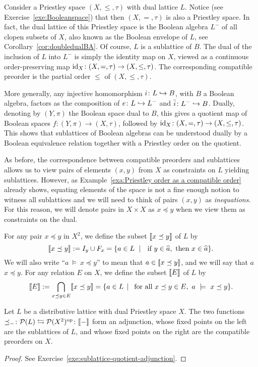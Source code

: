 \begin{example}\label{exa:Priestley order as a compatible order}
Consider a Priestley space $(X,\leq, \tau)$ with dual lattice $L$. Notice (see Exercise~\ref{exe:Booleanspace}) that then $(X,=,\tau)$ is also a Priestley space. In fact, the dual lattice of this Priestley space is the Boolean algebra $L^-$ of all clopen subsets of $X$, also known as the Boolean envelope of $L$, see Corollary~\ref{cor:doubledualBA}. Of course, $L$ is a sublattice of $B$. The dual of the inclusion of $L$ into $L^-$ is simply the identity map on $X$, viewed as a continuous order-preserving map $\mathrm{id}_X\colon (X,=,\tau)\to(X,\leq, \tau)$. The corresponding compatible preorder is the partial order $\leq$ of $(X,\leq, \tau)$.

More generally, any injective homomorphism $i \colon L \hookrightarrow B$, with $B$ a Boolean algebra, factors as the composition of $e \colon L \hookrightarrow L^-$ and $\bar{i} \colon L^- \hookrightarrow B$. Dually, denoting by $(Y,\pi)$ the Boolean space dual to $B$, this gives a quotient map of Boolean spaces $f \colon (Y,\pi) \to (X,\tau)$, followed by $\mathrm{id}_X \colon (X, =, \tau) \to (X, \leq,\tau)$. This shows that sublattices of Boolean algebras can be understood dually by a Boolean equivalence relation together with a Priestley order on the quotient.
\end{example}

As before, the correspondence between compatible preorders and sublattices allows us to view pairs of elements $(x,y)$ from $X$ as constraints on $L$ yielding sublattices. However, as Example~\ref{exa:Priestley order as a compatible order} already shows, equating elements of the space is not a fine enough notion to witness all sublattices and we will need to think of pairs $(x,y)$ as \emph{inequations}. For this reason, we will denote pairs in $X\times X$ as $x\preceq y$ when we view them as constraints on the dual.

\begin{definition}\label{def:ineq}
For any pair $x\preceq y$ in $X^2$, we define the subset $\llbracket {x\preceq y} \rrbracket$ of $L$ by
\[ \llbracket {x\preceq y} \rrbracket := I_y \cup F_x = \{a \in L \ \mid \ \text{ if } y \in \widehat{a}, \text{ then } x \in \widehat{a} \}.\]
We will also write ``$a\ \models\ x\preceq y$'' to mean that $a \in \llbracket {x \preceq y} \rrbracket$, and we will say that $a$  $x\preceq y$.
For any relation $E$ on $X$, we define the subset $\llbracket {E} \rrbracket$ of $L$ by
\[ 
\llbracket {E} \rrbracket := \bigcap_{x\preceq y \in E} \llbracket {x\preceq y} \rrbracket = \{a \in L \, \mid \, \text{ for all } x\preceq y \in E, \ a\ \models\ x\preceq y \}.
\]
\end{definition}
\begin{proposition}\label{prop:sublattice-quotientspace}
  Let $L$ be a distributive lattice with dual Priestley space $X$.  The two functions $\preceq_{-} \colon \mathcal{P}(L) \leftrightarrows \mathcal{P}(X^2)^{\mathrm{op}} \colon \llbracket {-} \rrbracket$ form an adjunction, whose fixed points on the left are the sublattices of $L$, and whose fixed points on the right are the compatible preorders on $X$.
\end{proposition}
\begin{proof}
See Exercise~\ref{exe:sublattice-quotient-adjunction}.
\end{proof}

